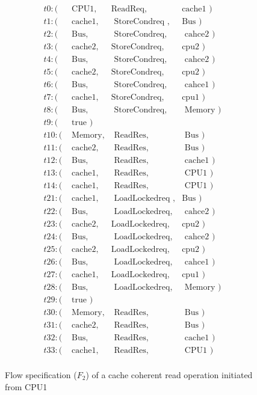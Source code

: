 \documentclass[conference]{IEEEtran}
\begin{document}
\begin{figure}
{\footnotesize
\[
\begin{array}{llll}
t0: (&\mbox{ CPU1},&\mbox{ReadReq},&\mbox{cache1  })\\                   
t1: (&\mbox{ cache1},&\mbox{ StoreCondreq },&\mbox{Bus })\\           
t2: (&\mbox{ Bus},&\mbox{ StoreCondreq},&\mbox{ cahce2 })\\
t3: (&\mbox{ cache2},&\mbox{StoreCondreq},&\mbox{cpu2       })\\      
t4: (&\mbox{ Bus},&\mbox{ StoreCondreq},&\mbox{ cahce2           })\\ 
t5: (&\mbox{ cache2},&\mbox{StoreCondreq},&\mbox{cpu2 })\\
t6: (&\mbox{ Bus},&\mbox{ StoreCondreq},&\mbox{ cahce1     })\\       
t7: (&\mbox{ cache1},&\mbox{StoreCondreq},&\mbox{cpu1           })\\ 
t8: (&\mbox{ Bus},&\mbox{ StoreCondreq},&\mbox{ Memory })\\
t9: (&\mbox{ true                                        })\\
t10: (&\mbox{ Memory},&\mbox{ ReadRes},&\mbox{ Bus            })\\    
t11: (&\mbox{ cache2},&\mbox{ ReadRes},&\mbox{ Bus })\\
t12: (&\mbox{ Bus},&\mbox{ ReadRes},&\mbox{ cache1      })\\            
t13: (&\mbox{ cache1},&\mbox{ ReadRes},&\mbox{ CPU1          })\\  
t14: (&\mbox{ cache1},&\mbox{ ReadRes},&\mbox{ CPU1 })\\
t21: (&\mbox{ cache1},&\mbox{ LoadLockedreq },&\mbox{Bus })\\     
t22: (&\mbox{ Bus},&\mbox{ LoadLockedreq},&\mbox{ cahce2     })\\
t23: (&\mbox{ cache2},&\mbox{LoadLockedreq},&\mbox{cpu2 })\\
t24: (&\mbox{ Bus},&\mbox{ LoadLockedreq},&\mbox{ cahce2     })\\ 
t25: (&\mbox{ cache2},&\mbox{LoadLockedreq},&\mbox{cpu2     })\\
t26: (&\mbox{ Bus},&\mbox{ LoadLockedreq},&\mbox{ cahce1 })\\
t27: (&\mbox{ cache1},&\mbox{LoadLockedreq},&\mbox{cpu1       })\\
t28: (&\mbox{ Bus},&\mbox{ LoadLockedreq},&\mbox{ Memory     })\\
t29: (&\mbox{ true })\\
t30: (&\mbox{ Memory},&\mbox{ ReadRes},&\mbox{ Bus       })\\     
t31: (&\mbox{ cache2},&\mbox{ ReadRes},&\mbox{ Bus    })\\
t32: (&\mbox{ Bus},&\mbox{ ReadRes},&\mbox{ cache1 })\\
t33: (&\mbox{ cache1},&\mbox{ ReadRes},&\mbox{ CPU1 })\\
\end{array}
\]}
\caption{Flow specification ($F_2$) of a cache coherent read operation initiated from CPU1}
\label{read-flow}

\end{figure}
\end{document}
